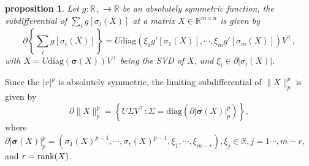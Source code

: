 \documentclass[twoside,11pt]{article}
\newtheorem{prop}{proposition}
\numberwithin{equation}{section}
\begin{document}
\begin{prop} \cite{opt_simu_svd_2017} Let $g:\mathbb{R}_{+}\to\mathbb{R} $ be an absolutely symmetric function,
  the subdifferential of $\sum\limits_{i} g[\sigma_{i}(X)] $ at a matrix $X\in\mathbb{R}^{m\times n} $ is given by  
  \begin{equation*}
    \partial\left\{\sum\limits_{i} g[\sigma_{i} (X)]\right\} = U\mathrm{diag} \left({\xi}_{1}g{'}[\sigma_{1}(X)],\cdots,\xi_{m}g{'}[\sigma_{m}(X)]\right)V^{\top}, 
  \end{equation*}
with $X=U\mathrm{diag} (\bm{\sigma} (X))V^{\top} $ being the SVD of $X $, and $\xi_{i}\in\partial|\sigma_{i} (X)| $. 
\end{prop}
Since the $|x|^{p}$ is absolutely symmetric, the limiting subdifferential of $\|X\|_{p}^{p} $ is given by  
\begin{equation*}
  \partial \|X\|_{p}^{p} = \left\{U\Sigma V^{\top}: \Sigma = \mathrm{diag} (\partial| \bm{\sigma} (X)|_{p}^{p}) \right\},      
\end{equation*}
where $\partial|\bm{\sigma} (X)|_{p}^{p}=  (\sigma_{1} (X)^{p-1},\cdots,\sigma_{r} (X)^{p-1},\xi_{1},\cdots,\xi_{m-r}),\xi_{j}\in\mathbb{R},j=1\cdots,m-r $, and $r= {\rm rank}(X)$.


\end{document}
